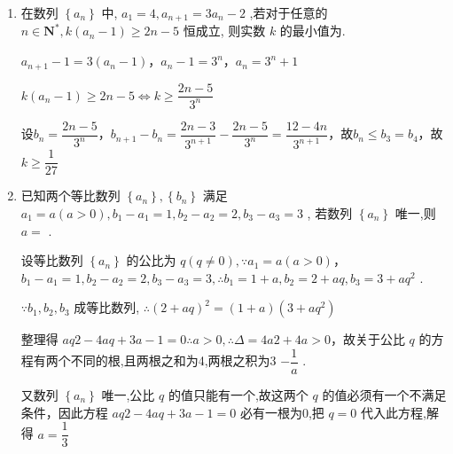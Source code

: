 \begin{enumerate}
\begin{jieda}
        不等式 $2{S}_{n} + 9 \geq  {\left( -1\right) }^{n}k{a}_{n}$即$n^2+n+9 \geq (-1)^nnk$

        根据对勾函数性质可得$k \in \left[-7, \dfrac{29}{4}\right]$
    \end{jieda}
    
    \item 在数列 $\left\{  {a}_{n}\right\}$ 中, ${a}_{1} = 4,{a}_{n + 1} = 3{a}_{n} - 2$ ,若对于任意的 $n \in  {\mathbf{N}}^{ * },k\left( {{a}_{n} - 1}\right)  \geq  {2n} - 5$ 恒成立, 则实数 $k$ 的最小值为.
    \begin{jieda}
        $a_{n+1} - 1 = 3(a_n - 1)$，$a_n - 1 = 3^n$，$a_n = 3^n + 1$

        $k\left( {{a}_{n} - 1}\right)  \geq  {2n} - 5 \Longleftrightarrow k \geq \dfrac{2n-5}{3^n}$

        设$b_n = \dfrac{2n-5}{3^n}$，$b_{n+1} - b_n = \dfrac{2n-3}{3^{n+1}} - \dfrac{2n-5}{3^n} = \dfrac{12-4n}{3^{n+1}}$，故$b_n \leq b_3 = b_4$，故$k \geq \dfrac{1}{27}$
    \end{jieda}
    
    \item 已知两个等比数列 $\left\{  {a}_{n}\right\}  ,\left\{  {b}_{n}\right\}$ 满足 ${a}_{1} = a\left( {a > 0}\right) ,{b}_{1} - {a}_{1} = 1,{b}_{2} - {a}_{2} = 2,{b}_{3} - {a}_{3} = 3$ , 若数列 $\left\{  {a}_{n}\right\}$ 唯一,则 $a =$ .
    \begin{jieda}
        设等比数列 $\left\{  {a}_{n}\right\}$ 的公比为 $q\left( {q \neq  0}\right) ,\because {a}_{1} = a\left( {a > 0}\right)$，${b}_{1} - {a}_{1} = 1,{b}_{2} - {a}_{2} = 2,{b}_{3} - {a}_{3} = 3,\therefore {b}_{1} = 1 + a,{b}_{2} = 2 + {aq},{b}_{3} = 3 + a{q}^{2}$ .
        
        $\because {b}_{1},{b}_{2},{b}_{3}$ 成等比数列, $\therefore {\left( 2 + aq\right) }^{2} = \left( {1 + a}\right) \left( {3 + a{q}^{2}}\right)$

        整理得 ${aq2} - {4aq} + {3a} - 1 = 0\therefore a > 0,\therefore \Delta  = {4a2} + {4a} > 0$，故关于公比 $q$ 的方程有两个不同的根,且两根之和为4,两根之积为3 $- \dfrac{1}{a}$ .
        
        又数列 $\left\{  {a}_{n}\right\}$ 唯一,公比 $q$ 的值只能有一个,故这两个 $q$ 的值必须有一个不满足条件，因此方程 ${aq2} - {4aq} + {3a} - 1 = 0$ 必有一根为0,把 $q = 0$ 代入此方程,解得 $a = \dfrac{1}{3}$ 
    \end{jieda}
    

\end{enumerate}
